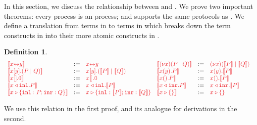 \documentclass[copyright,creativecommons]{eptcs}
\def\coloneqq{\mathbin{:=}}
\newtheorem{definition}[lemma]{Definition}
\begin{document}
In this section, we discuss the relationship between \cp and \hcp. We prove two important theorems: every \cp process is an \hcp process; and \hcp supports the same protocols as \cp. We define a translation from terms in \cp to terms in \hcp which breaks down the term constructs in \cp into their more atomic constructs in \hcp.
\begin{definition}\label{def:cp2hcp-terms}
  \[
    \begin{array}{lcllcl}
         \tm{\mtf{\cpLink{x}{y}}}
      &  \coloneqq & \tm{\cpLink{x}{y}}
      &  \tm{\mtf{\cpCut{x}{P}{Q}}}
      &  \coloneqq & \tm{\piNew{x}{(\piPar{\mtf{P}}{\mtf{Q}})}}
      \\ \tm{\mtf{\cpSend{x}{y}{P}{Q}}}
      &  \coloneqq & \tm{\piBoundSend{x}{y}{(\piPar{\mtf{P}}{\mtf{Q}})}}
      &  \tm{\mtf{\cpRecv{x}{y}{P}}}
      &  \coloneqq & \tm{\piRecv{x}{y}{\mtf{P}}}
      \\ \tm{\mtf{\cpHalt{x}}}
      &  \coloneqq & \tm{\piBoundSend{x}{}{\piHalt}}
      &  \tm{\mtf{\cpWait{x}{P}}}
      &  \coloneqq & \tm{\piRecv{x}{}{\mtf{P}}}
      \\ \tm{\mtf{\cpInl{x}{P}}}
      &  \coloneqq & \tm{\cpInl{x}{\mtf{P}}}
      &  \tm{\mtf{\cpInr{x}{P}}}
      &  \coloneqq & \tm{\cpInr{x}{\mtf{P}}}
      \\ \tm{\mtf{\cpCase{x}{P}{Q}}}
      &  \coloneqq & \tm{\cpCase{x}{\mtf{P}}{\mtf{Q}}}
      &  \tm{\mtf{\cpAbsurd{x}}}
      &  \coloneqq & \tm{\cpAbsurd{x}}
    \end{array}
  \]
\end{definition}\noindent
We use this relation in the first proof, and its analogue for derivations in the second.
\end{document}
